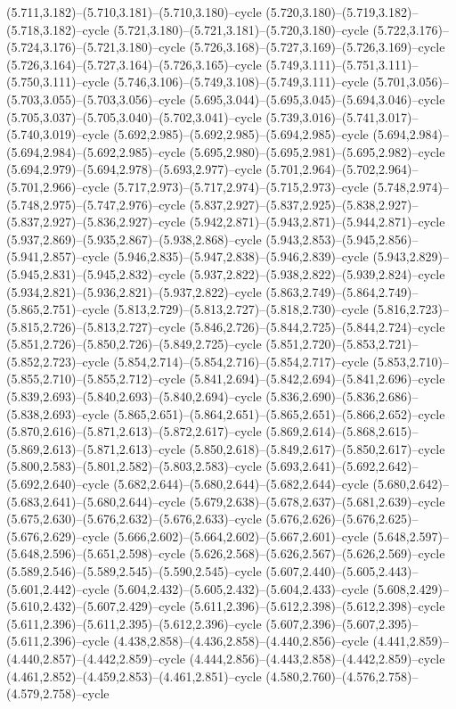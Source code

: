 (5.711,3.182)--(5.710,3.181)--(5.710,3.180)--cycle (5.720,3.180)--(5.719,3.182)--(5.718,3.182)--cycle (5.721,3.180)--(5.721,3.181)--(5.720,3.180)--cycle (5.722,3.176)--(5.724,3.176)--(5.721,3.180)--cycle (5.726,3.168)--(5.727,3.169)--(5.726,3.169)--cycle (5.726,3.164)--(5.727,3.164)--(5.726,3.165)--cycle (5.749,3.111)--(5.751,3.111)--(5.750,3.111)--cycle (5.746,3.106)--(5.749,3.108)--(5.749,3.111)--cycle (5.701,3.056)--(5.703,3.055)--(5.703,3.056)--cycle (5.695,3.044)--(5.695,3.045)--(5.694,3.046)--cycle (5.705,3.037)--(5.705,3.040)--(5.702,3.041)--cycle (5.739,3.016)--(5.741,3.017)--(5.740,3.019)--cycle (5.692,2.985)--(5.692,2.985)--(5.694,2.985)--cycle (5.694,2.984)--(5.694,2.984)--(5.692,2.985)--cycle (5.695,2.980)--(5.695,2.981)--(5.695,2.982)--cycle (5.694,2.979)--(5.694,2.978)--(5.693,2.977)--cycle (5.701,2.964)--(5.702,2.964)--(5.701,2.966)--cycle (5.717,2.973)--(5.717,2.974)--(5.715,2.973)--cycle (5.748,2.974)--(5.748,2.975)--(5.747,2.976)--cycle (5.837,2.927)--(5.837,2.925)--(5.838,2.927)--(5.837,2.927)--(5.836,2.927)--cycle (5.942,2.871)--(5.943,2.871)--(5.944,2.871)--cycle (5.937,2.869)--(5.935,2.867)--(5.938,2.868)--cycle (5.943,2.853)--(5.945,2.856)--(5.941,2.857)--cycle (5.946,2.835)--(5.947,2.838)--(5.946,2.839)--cycle (5.943,2.829)--(5.945,2.831)--(5.945,2.832)--cycle (5.937,2.822)--(5.938,2.822)--(5.939,2.824)--cycle (5.934,2.821)--(5.936,2.821)--(5.937,2.822)--cycle (5.863,2.749)--(5.864,2.749)--(5.865,2.751)--cycle (5.813,2.729)--(5.813,2.727)--(5.818,2.730)--cycle (5.816,2.723)--(5.815,2.726)--(5.813,2.727)--cycle (5.846,2.726)--(5.844,2.725)--(5.844,2.724)--cycle (5.851,2.726)--(5.850,2.726)--(5.849,2.725)--cycle (5.851,2.720)--(5.853,2.721)--(5.852,2.723)--cycle (5.854,2.714)--(5.854,2.716)--(5.854,2.717)--cycle (5.853,2.710)--(5.855,2.710)--(5.855,2.712)--cycle (5.841,2.694)--(5.842,2.694)--(5.841,2.696)--cycle (5.839,2.693)--(5.840,2.693)--(5.840,2.694)--cycle (5.836,2.690)--(5.836,2.686)--(5.838,2.693)--cycle (5.865,2.651)--(5.864,2.651)--(5.865,2.651)--(5.866,2.652)--cycle (5.870,2.616)--(5.871,2.613)--(5.872,2.617)--cycle (5.869,2.614)--(5.868,2.615)--(5.869,2.613)--(5.871,2.613)--cycle (5.850,2.618)--(5.849,2.617)--(5.850,2.617)--cycle (5.800,2.583)--(5.801,2.582)--(5.803,2.583)--cycle (5.693,2.641)--(5.692,2.642)--(5.692,2.640)--cycle (5.682,2.644)--(5.680,2.644)--(5.682,2.644)--cycle (5.680,2.642)--(5.683,2.641)--(5.680,2.644)--cycle (5.679,2.638)--(5.678,2.637)--(5.681,2.639)--cycle (5.675,2.630)--(5.676,2.632)--(5.676,2.633)--cycle (5.676,2.626)--(5.676,2.625)--(5.676,2.629)--cycle (5.666,2.602)--(5.664,2.602)--(5.667,2.601)--cycle (5.648,2.597)--(5.648,2.596)--(5.651,2.598)--cycle (5.626,2.568)--(5.626,2.567)--(5.626,2.569)--cycle (5.589,2.546)--(5.589,2.545)--(5.590,2.545)--cycle (5.607,2.440)--(5.605,2.443)--(5.601,2.442)--cycle (5.604,2.432)--(5.605,2.432)--(5.604,2.433)--cycle (5.608,2.429)--(5.610,2.432)--(5.607,2.429)--cycle (5.611,2.396)--(5.612,2.398)--(5.612,2.398)--cycle (5.611,2.396)--(5.611,2.395)--(5.612,2.396)--cycle (5.607,2.396)--(5.607,2.395)--(5.611,2.396)--cycle (4.438,2.858)--(4.436,2.858)--(4.440,2.856)--cycle (4.441,2.859)--(4.440,2.857)--(4.442,2.859)--cycle (4.444,2.856)--(4.443,2.858)--(4.442,2.859)--cycle (4.461,2.852)--(4.459,2.853)--(4.461,2.851)--cycle (4.580,2.760)--(4.576,2.758)--(4.579,2.758)--cycle 